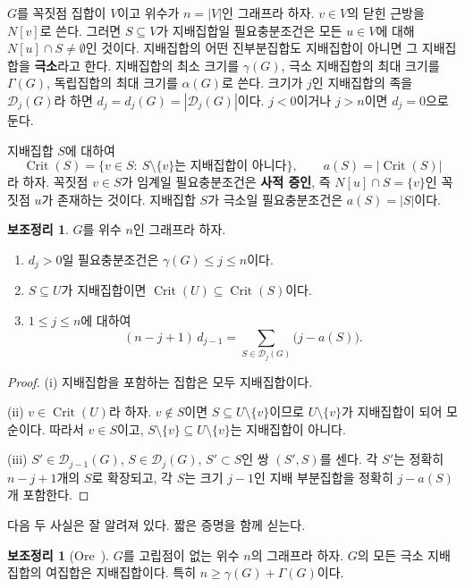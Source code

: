 \documentclass[11pt,a4paper]{article}
\theoremstyle{definition}
\newtheorem{lemma}[theorem]{보조정리}
\newcommand{\Dom}{\mathcal{D}}
\newcommand{\Crit}{\operatorname{Crit}}
\begin{document}
$G$를 꼭짓점 집합이 $V$이고 위수가 $n=|V|$인 그래프라 하자. $v\in V$의 닫힌 근방을
$N[v]$로 쓴다. 그러면 $S\subseteq V$가 지배집합일 필요충분조건은 모든 $u\in V$에 대해
$N[u]\cap S\ne\emptyset$인 것이다. 지배집합의 어떤 진부분집합도 지배집합이 아니면
그 지배집합을 \textbf{극소}라고 한다. 지배집합의 최소 크기를 $\gamma(G)$, 극소
지배집합의 최대 크기를 $\Gamma(G)$, 독립집합의 최대 크기를 $\alpha(G)$로 쓴다.
크기가 $j$인 지배집합의 족을 $\Dom_j(G)$라 하면 $d_j=d_j(G)=|\Dom_j(G)|$이다.
$j<0$이거나 $j>n$이면 $d_j=0$으로 둔다.

지배집합 $S$에 대하여
\[
  \Crit(S)=\{v\in S:\ S\setminus\{v\}\text{는 지배집합이 아니다}\},\qquad
  a(S)=|\Crit(S)|
\]
라 하자. 꼭짓점 $v\in S$가 임계일 필요충분조건은 \textbf{사적 증인}, 즉
$N[u]\cap S=\{v\}$인 꼭짓점 $u$가 존재하는 것이다. 지배집합 $S$가 극소일 필요충분조건은
$a(S)=|S|$이다.

\begin{lemma}\label{lem:basic}
$G$를 위수 $n$인 그래프라 하자.
\begin{enumerate}
\item[\textup{(i)}] $d_j>0$일 필요충분조건은 $\gamma(G)\le j\le n$이다.
\item[\textup{(ii)}] $S\subseteq U$가 지배집합이면 $\Crit(U)\subseteq\Crit(S)$이다.
\item[\textup{(iii)}] $1\le j\le n$에 대하여
\begin{equation}\label{eq:incidence}
  (n-j+1)\,d_{j-1}=\sum_{S\in\Dom_j(G)}\bigl(j-a(S)\bigr).
\end{equation}
\end{enumerate}
\end{lemma}

\begin{proof}
(i) 지배집합을 포함하는 집합은 모두 지배집합이다.

(ii) $v\in\Crit(U)$라 하자. $v\notin S$이면 $S\subseteq U\setminus\{v\}$이므로
$U\setminus\{v\}$가 지배집합이 되어 모순이다. 따라서 $v\in S$이고,
$S\setminus\{v\}\subseteq U\setminus\{v\}$는 지배집합이 아니다.

(iii) $S'\in\Dom_{j-1}(G)$, $S\in\Dom_j(G)$, $S'\subset S$인 쌍 $(S',S)$를 센다. 각
$S'$는 정확히 $n-j+1$개의 $S$로 확장되고, 각 $S$는 크기 $j-1$인 지배 부분집합을
정확히 $j-a(S)$개 포함한다.
\end{proof}

다음 두 사실은 잘 알려져 있다. 짧은 증명을 함께 싣는다.

\begin{lemma}[Ore~\cite{Ore}]\label{lem:ore}
$G$를 고립점이 없는 위수 $n$의 그래프라 하자. $G$의 모든 극소 지배집합의 여집합은
지배집합이다. 특히 $n\ge\gamma(G)+\Gamma(G)$이다.
\end{lemma}
\end{document}

